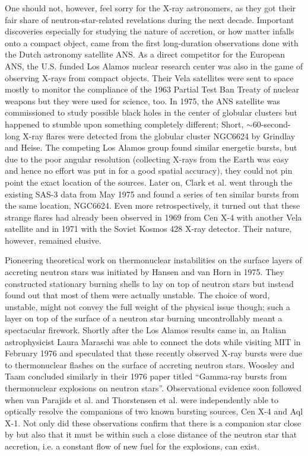 One should not, however, feel sorry for the X-ray astronomers, as they got their fair share of neutron-star-related revelations during the next decade.
Important discoveries especially for studying the nature of accretion, or how matter infalls onto a compact object, came from the first long-duration observations done with the Dutch astronomy satellite ANS.
As a direct competitor for the European ANS, the U.S. funded Los Alamos nuclear research center was also in the game of observing X-rays from compact objects.
Their Vela satellites were sent to space mostly to monitor the compliance of the 1963 Partial Test Ban Treaty of nuclear weapons but they were used for science, too.
In 1975, the ANS satellite was commissioned to study possible black holes in the center of globular clusters but happened to stumble upon something completely different;
Short, $\sim 60$-second-long X-ray flares were detected from the globular cluster NGC6624 by Grindlay and Heise.\cite{GGS76}
The competing Los Alamos group found similar energetic bursts, but due to the poor angular resolution (collecting X-rays from the Earth was easy and hence no effort was put in for a good spatial accuracy), they could not pin point the exact location of the sources.\cite{BCE76}
Later on, Clark et al. went through the existing SAS-3 data from May 1975 and found a series of ten similar bursts from the same location, NGC6624.\cite{CJB76}
Even more retrospectively, it turned out that these strange flares had already been observed in 1969 from Cen X-4\cite{BCE72} with another Vela satellite and in 1971 with the Soviet Kosmos 428 X-ray detector\cite{BKM75}.
Their nature, however, remained elusive.

Pioneering theoretical work on thermonuclear instabilities on the surface layers of accreting neutron stars was initiated by Hansen and van Horn in 1975.\cite{HvH75}
They constructed stationary burning shells to lay on top of neutron stars but instead found out that most of them were actually unstable.
The choice of word, unstable, might not convey the full weight of the physical issue though;
such a layer on top of the surface of a neutron star burning uncontrollably meant a spectacular firework.
Shortly after the Los Alamos results came in, an Italian astrophysicist Laura Maraschi was able to connect the dots while visiting MIT in February 1976 and speculated that these recently observed X-ray bursts were due to thermonuclear flashes on the surface of accreting neutron stars.\cite{MC77, Lewin93}
Woosley and Taam concluded similarly in their 1976 paper titled ``Gamma-ray bursts from thermonuclear explosions on neutron stars''.
Observational evidence soon followed when van Parajids et al. and Thorstensen et al. were independently able to optically resolve the companions of two known bursting sources, Cen X-4\cite{vPV80} and Aql X-1\cite{TCB78}.
Not only did these observations confirm that there is a companion star close by but also that it must be within such a close distance of the neutron star that accretion, i.e. a constant flow of new fuel for the explosions, can exist.

